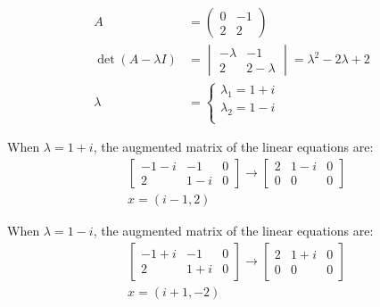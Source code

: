 \documentclass[letterpaper, 11pt]{article}
\newcommand{\1}{\mathds{1}}	%
\theoremstyle{definition}
\begin{document}
\begin{align*}
    A                    & = \begin{pmatrix}
                                 0 & -1 \\
                                 2 & 2
                             \end{pmatrix}                            \\
    \det (A - \lambda I) & = \begin{vmatrix}
                                 -\lambda & -1        \\
                                 2        & 2-\lambda
                             \end{vmatrix} = \lambda ^{2} - 2\lambda+2 \\
    \lambda              & = \left\{\begin{array}{l}
                                        \lambda_{1} = 1+i \\
                                        \lambda_{2} = 1-i \\
                                    \end{array}\right.
\end{align*}

When $\lambda = 1+i$, the augmented matrix of the linear equations are: \begin{align*}
     & \left[\begin{array}{cc|c}
                     -1-i & -1  & 0 \\
                     2    & 1-i & 0
                 \end{array}\right] \to \left[\begin{array}{cc|c}
                                                  2 & 1-i & 0 \\
                                                  0 & 0   & 0
                                              \end{array}\right] \\
     & x=(i-1,2)
\end{align*}

When $\lambda = 1-i$, the augmented matrix of the linear equations are: \begin{align*}
     & \left[\begin{array}{cc|c}
                     -1+i & -1  & 0 \\
                     2    & 1+i & 0
                 \end{array}\right] \to \left[\begin{array}{cc|c}
                                                  2 & 1+i & 0 \\
                                                  0 & 0   & 0
                                              \end{array}\right] \\
     & x=(i+1,-2)
\end{align*}
\end{document}
